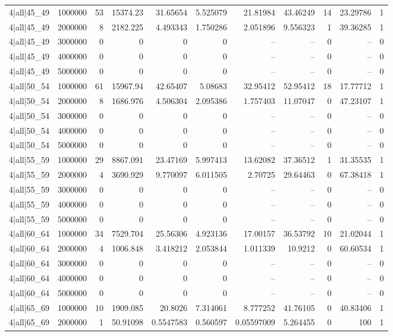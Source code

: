 \begin{tabular}{lrrrrrrrrrr}
4|all|45\_49 & 1000000 & 53 & 15374.23 & 31.65654 & 5.525079 & 21.81984 & 43.46249 & 14 & 23.29786 & 1 \\
4|all|45\_49 & 2000000 & 8 & 2182.225 & 4.493343 & 1.750286 & 2.051896 & 9.556323 & 1 & 39.36285 & 1 \\
4|all|45\_49 & 3000000 & 0 & 0 & 0 & 0 & -- & -- & 0 & -- & 0 \\
4|all|45\_49 & 4000000 & 0 & 0 & 0 & 0 & -- & -- & 0 & -- & 0 \\
4|all|45\_49 & 5000000 & 0 & 0 & 0 & 0 & -- & -- & 0 & -- & 0 \\
4|all|50\_54 & 1000000 & 61 & 15967.94 & 42.65407 & 5.08683 & 32.95412 & 52.95412 & 18 & 17.77712 & 1 \\
4|all|50\_54 & 2000000 & 8 & 1686.976 & 4.506304 & 2.095386 & 1.757403 & 11.07047 & 0 & 47.23107 & 1 \\
4|all|50\_54 & 3000000 & 0 & 0 & 0 & 0 & -- & -- & 0 & -- & 0 \\
4|all|50\_54 & 4000000 & 0 & 0 & 0 & 0 & -- & -- & 0 & -- & 0 \\
4|all|50\_54 & 5000000 & 0 & 0 & 0 & 0 & -- & -- & 0 & -- & 0 \\
4|all|55\_59 & 1000000 & 29 & 8867.091 & 23.47169 & 5.997413 & 13.62082 & 37.36512 & 1 & 31.35535 & 1 \\
4|all|55\_59 & 2000000 & 4 & 3690.929 & 9.770097 & 6.011505 & 2.70725 & 29.64463 & 0 & 67.38418 & 1 \\
4|all|55\_59 & 3000000 & 0 & 0 & 0 & 0 & -- & -- & 0 & -- & 0 \\
4|all|55\_59 & 4000000 & 0 & 0 & 0 & 0 & -- & -- & 0 & -- & 0 \\
4|all|55\_59 & 5000000 & 0 & 0 & 0 & 0 & -- & -- & 0 & -- & 0 \\
4|all|60\_64 & 1000000 & 34 & 7529.704 & 25.56306 & 4.923136 & 17.00157 & 36.53792 & 10 & 21.02044 & 1 \\
4|all|60\_64 & 2000000 & 4 & 1006.848 & 3.418212 & 2.053844 & 1.011339 & 10.9212 & 0 & 60.60534 & 1 \\
4|all|60\_64 & 3000000 & 0 & 0 & 0 & 0 & -- & -- & 0 & -- & 0 \\
4|all|60\_64 & 4000000 & 0 & 0 & 0 & 0 & -- & -- & 0 & -- & 0 \\
4|all|60\_64 & 5000000 & 0 & 0 & 0 & 0 & -- & -- & 0 & -- & 0 \\
4|all|65\_69 & 1000000 & 10 & 1909.085 & 20.8026 & 7.314061 & 8.777252 & 41.76105 & 0 & 40.83406 & 1 \\
4|all|65\_69 & 2000000 & 1 & 50.91098 & 0.5547583 & 0.560597 & 0.05597009 & 5.264455 & 0 & 100 & 1 \\

\end{tabular}
